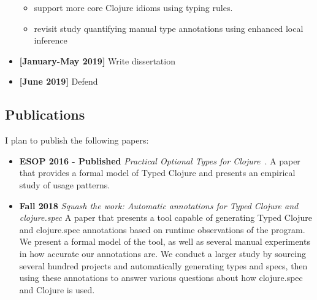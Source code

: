 \documentclass[9pt]{extarticle}
\begin{document}
\begin{itemize}
    \begin{itemize}
      \item support more core Clojure idioms using typing rules.
      \item revisit study quantifying manual type annotations using enhanced local inference
    \end{itemize}
  \item \textbf{[January-May 2019]} Write dissertation
  \item \textbf{[June 2019]} Defend
\end{itemize}

\subsection{Publications}

I plan to publish the following papers:

\begin{itemize}
  \item \textbf{ESOP 2016 - Published} \emph{Practical Optional Types for Clojure}~\cite{bonnaire2016practical}.
    A paper that provides a formal model of Typed Clojure and presents an empirical
    study of usage patterns.
  \item \textbf{Fall 2018} \emph{Squash the work: Automatic annotations for Typed Clojure and clojure.spec}
    A paper that presents a tool capable of generating Typed Clojure and clojure.spec
    annotations based on runtime observations of the program.
    We present a formal model of the tool, as well as several manual experiments in how
    accurate our annotations are.
    We conduct a larger study by sourcing several hundred projects and automatically
    generating types and specs, then using these annotations to answer various questions
    about how clojure.spec and Clojure is used.
\end{itemize}


\printbibliography
\end{document}
